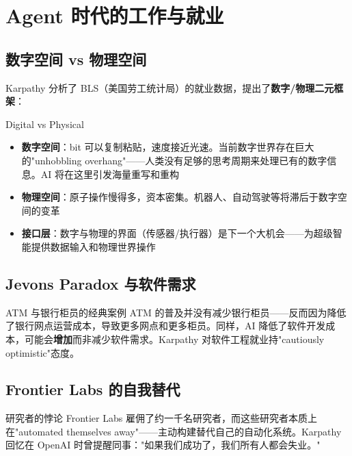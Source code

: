 \section{Agent 时代的工作与就业}

\subsection{数字空间 vs 物理空间}

Karpathy 分析了 BLS（美国劳工统计局）的就业数据，提出了\textbf{数字/物理二元框架}：

\begin{importantbox}{Digital vs Physical}
\begin{itemize}
    \item \textbf{数字空间}：bit 可以复制粘贴，速度接近光速。当前数字世界存在巨大的"unhobbling overhang"——人类没有足够的思考周期来处理已有的数字信息。AI 将在这里引发海量重写和重构
    \item \textbf{物理空间}：原子操作慢得多，资本密集。机器人、自动驾驶等将滞后于数字空间的变革
    \item \textbf{接口层}：数字与物理的界面（传感器/执行器）是下一个大机会——为超级智能提供数据输入和物理世界操作
\end{itemize}
\end{importantbox}

\subsection{Jevons Paradox 与软件需求}

\begin{knowledgebox}{ATM 与银行柜员的经典案例}
ATM 的普及并没有减少银行柜员——反而因为降低了银行网点运营成本，导致更多网点和更多柜员。同样，AI 降低了软件开发成本，可能会\textbf{增加}而非减少软件需求。Karpathy 对软件工程就业持"cautiously optimistic"态度。
\end{knowledgebox}

\subsection{Frontier Labs 的自我替代}

\begin{warningbox}{研究者的悖论}
Frontier Labs 雇佣了约一千名研究者，而这些研究者本质上在"automated themselves away"——主动构建替代自己的自动化系统。Karpathy 回忆在 OpenAI 时曾提醒同事："如果我们成功了，我们所有人都会失业。"
\end{warningbox}

